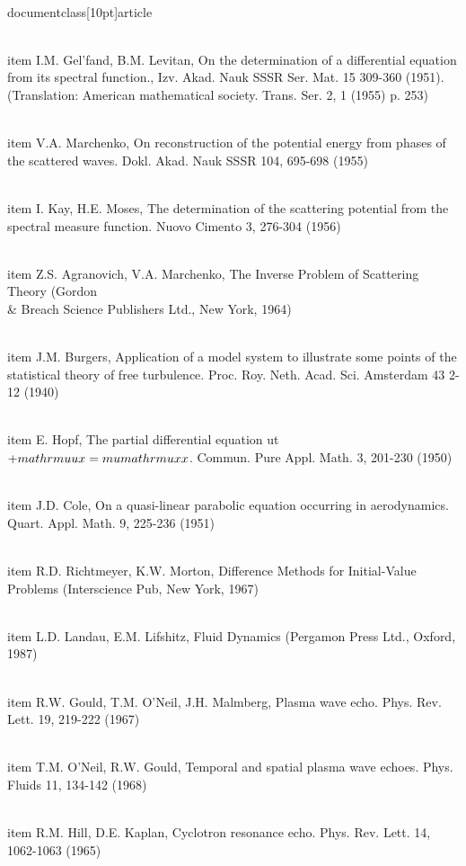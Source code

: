 \\documentclass[10pt]{article}
\begin{document}
{{{{{  \\item I.M. Gel'fand, B.M. Levitan, On the determination of a differential equation from its spectral function., Izv. Akad. Nauk SSSR Ser. Mat. 15 309-360 (1951). (Translation: American mathematical society. Trans. Ser. 2, 1 (1955) p. 253)

  \\item V.A. Marchenko, On reconstruction of the potential energy from phases of the scattered waves. Dokl. Akad. Nauk SSSR 104, 695-698 (1955)

  \\item I. Kay, H.E. Moses, The determination of the scattering potential from the spectral measure function. Nuovo Cimento 3, 276-304 (1956)

  \\item Z.S. Agranovich, V.A. Marchenko, The Inverse Problem of Scattering Theory (Gordon \\& Breach Science Publishers Ltd., New York, 1964)

  \\item J.M. Burgers, Application of a model system to illustrate some points of the statistical theory of free turbulence. Proc. Roy. Neth. Acad. Sci. Amsterdam 43 2-12 (1940)

  \\item E. Hopf, The partial differential equation ut $+\\mathrm{uux}=\\mu \\mathrm{uxx}$. Commun. Pure Appl. Math. 3, 201-230 (1950)

  \\item J.D. Cole, On a quasi-linear parabolic equation occurring in aerodynamics. Quart. Appl. Math. 9, 225-236 (1951)

  \\item R.D. Richtmeyer, K.W. Morton, Difference Methods for Initial-Value Problems (Interscience Pub, New York, 1967)

  \\item L.D. Landau, E.M. Lifshitz, Fluid Dynamics (Pergamon Press Ltd., Oxford, 1987)

  \\item R.W. Gould, T.M. O'Neil, J.H. Malmberg, Plasma wave echo. Phys. Rev. Lett. 19, 219-222 (1967)

  \\item T.M. O'Neil, R.W. Gould, Temporal and spatial plasma wave echoes. Phys. Fluids 11, 134-142 (1968)

  \\item R.M. Hill, D.E. Kaplan, Cyclotron resonance echo. Phys. Rev. Lett. 14, 1062-1063 (1965)

}}}}}
\end{document}
